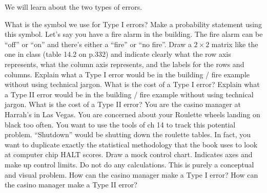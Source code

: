 \documentclass[12pt]{article}
\begin{document}
\problem We will learn about the two types of errors.

\benum
\easysubproblem What is the symbol we use for Type I errors? Make a probability statement using this symbol.
\easysubproblem Let's say you have a fire alarm in the building. The fire alarm can be ``off'' or ``on'' and there's either a ``fire'' or ``no fire''. Draw a $2 \times 2$ matrix like the one in class (table 14.2 on p.332) and indicate clearly what the row axis represents, what the column axis represents, and the labels for the rows and columns.
\easysubproblem Explain what a Type I error would be in the building / fire example without using technical jargon. 
\easysubproblem What is the cost of a Type I error?
\easysubproblem Explain what a Type II error would be in the building / fire example without using technical jargon.
\easysubproblem What is the cost of a Type II error?
\intermediatesubproblem You are the casino manager at Harrah's in Las Vegas. You are concerned about your Roulette wheels landing on black too often. You want to use the tools of ch 14 to track this potential problem. ``Shutdown'' would be shutting down the roulette tables. In fact, you want to duplicate exactly the statistical methodology that the book uses to look at computer chip HALT scores. Draw a mock control chart. Indicates axes and make up control limits. Do not do any calculations. This is purely a conceptual and visual problem.
\intermediatesubproblem How can the casino manager make a Type I error?
\intermediatesubproblem How can the casino manager make a Type II error?
\eenum
\end{document}
